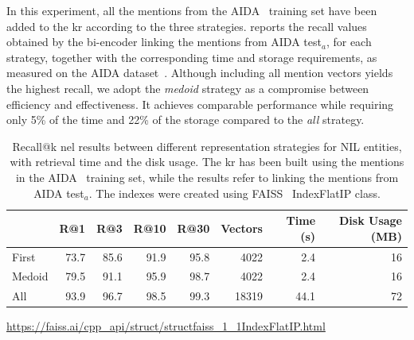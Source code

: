 In this experiment, all the mentions from the AIDA~\cite{aida} training set have been added to the \ac{kr} according to the three strategies.
 reports the recall values obtained by the bi-encoder linking the mentions from AIDA test$_a$, for each strategy, together with the corresponding time and storage requirements, as measured on the AIDA dataset~\cite{aida}.
Although including all mention vectors yields the highest recall, we adopt the \textit{medoid} strategy as a compromise between efficiency and effectiveness. It achieves comparable performance while requiring only 5\% of the time and 22\% of the storage compared to the \textit{all} strategy.
\begin{table}[!htbp]
\centering
\begin{threeparttable}
    \caption[Recall@k \acs{nel} results with different representations for NIL entities.]{Recall@k \ac{nel} results between different representation strategies for NIL entities, with retrieval time and the disk usage. The \acl{kr} has been built using the mentions in the AIDA~\cite{aida} training set, while the results refer to linking the mentions from AIDA test$_a$. The indexes were created using FAISS~\cite{faiss} IndexFlatIP class.}
    \label{tab:new_entities_recall}
    \begin{tabular}{l|rrrr|rrr}
        \toprule
         & \textbf{R@1} & \textbf{R@3} & \textbf{R@10} & \textbf{R@30} & \textbf{Vectors} & \textbf{Time (s)} & \textbf{Disk Usage (MB)} \\
         \midrule
         First  & 73.7 & 85.6 & 91.9 & 95.8 &  4022 &  2.4 & 16\\
         Medoid & 79.5 & 91.1 & 95.9 & 98.7 &  4022 &  2.4 & 16\\
         All    & 93.9 & 96.7 & 98.5 & 99.3 &  18319 &  44.1 & 72 \\
        \bottomrule
    \end{tabular}
    \begin{tablenotes}
        \footnotesize
        \item[1] \url{https://faiss.ai/cpp_api/struct/structfaiss_1_1IndexFlatIP.html}
    \end{tablenotes}
\end{threeparttable}
\end{table}




